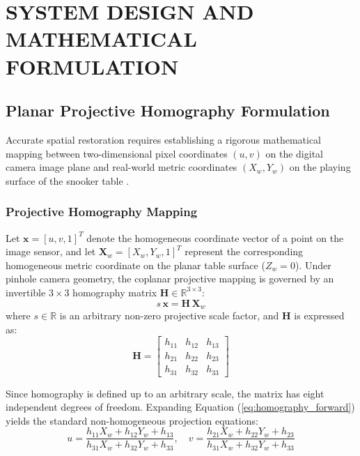 \chapter{SYSTEM DESIGN AND MATHEMATICAL FORMULATION}

\section{Planar Projective Homography Formulation}
Accurate spatial restoration requires establishing a rigorous mathematical mapping between two-dimensional pixel coordinates $(u, v)$ on the digital camera image plane and real-world metric coordinates $(X_w, Y_w)$ on the playing surface of the snooker table \cite{ref19}.

\subsection{Projective Homography Mapping}
Let $\mathbf{x} = [u, v, 1]^T$ denote the homogeneous coordinate vector of a point on the image sensor, and let $\mathbf{X}_w = [X_w, Y_w, 1]^T$ represent the corresponding homogeneous metric coordinate on the planar table surface ($Z_w = 0$). Under pinhole camera geometry, the coplanar projective mapping is governed by an invertible $3 \times 3$ homography matrix $\mathbf{H} \in \mathbb{R}^{3 \times 3}$:
\begin{equation}
    s \, \mathbf{x} = \mathbf{H} \, \mathbf{X}_w
    \label{eq:homography_forward}
\end{equation}
where $s \in \mathbb{R}$ is an arbitrary non-zero projective scale factor, and $\mathbf{H}$ is expressed as:
\begin{equation}
    \mathbf{H} = \begin{bmatrix}
        h_{11} & h_{12} & h_{13} \\
        h_{21} & h_{22} & h_{23} \\
        h_{31} & h_{32} & h_{33}
    \end{bmatrix}
    \label{eq:h_matrix}
\end{equation}

Since homography is defined up to an arbitrary scale, the matrix has eight independent degrees of freedom. Expanding Equation (\ref{eq:homography_forward}) yields the standard non-homogeneous projection equations:
\begin{equation}
    u = \frac{h_{11} X_w + h_{12} Y_w + h_{13}}{h_{31} X_w + h_{32} Y_w + h_{33}}, \quad
    v = \frac{h_{21} X_w + h_{22} Y_w + h_{23}}{h_{31} X_w + h_{32} Y_w + h_{33}}
    \label{eq:expanded_uv}
\end{equation}

